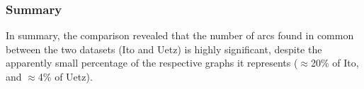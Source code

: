 \subsubsection{Summary}

In summary, the comparison revealed that the number of arcs found in
common between the two datasets (Ito and Uetz) is highly significant,
despite the apparently small percentage of the respective graphs it
represents ($\approx$20\% of Ito, and $\approx$4\% of Uetz).



